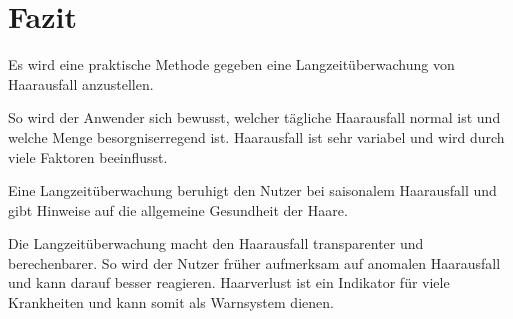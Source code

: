 \documentclass[german,a4paper,12pt]{llncs}
\begin{document}
\section{Fazit}
Es wird eine praktische Methode gegeben eine Langzeitüberwachung von Haarausfall anzustellen. 

So wird der Anwender sich bewusst, welcher tägliche Haarausfall normal ist und welche Menge besorgniserregend ist. Haarausfall ist sehr variabel und wird durch viele Faktoren beeinflusst. 

Eine Langzeitüberwachung beruhigt den Nutzer bei saisonalem Haarausfall und gibt Hinweise auf die allgemeine Gesundheit der Haare. 

Die Langzeitüberwachung macht den Haarausfall transparenter und berechenbarer. So wird der Nutzer früher aufmerksam auf anomalen Haarausfall und kann darauf besser reagieren. Haarverlust ist ein Indikator für viele Krankheiten und kann somit als Warnsystem dienen.





\newpage
\printbibliography
\end{document}
